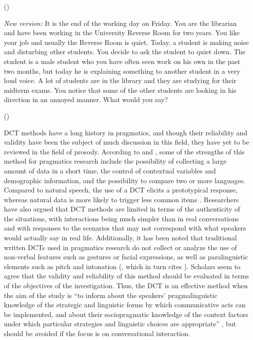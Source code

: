 \documentclass[output=paper]{LSP/langsci}
\begin{document}
(\citealt{Billmyer2000})

\textit{New version:} It is the end of the working day on Friday. You are the librarian and have been working in the University Reverse Room for two years. You like your job and usually the Reverse Room is quiet. Today, a student is making noise and disturbing other students. You decide to ask the student to quiet down. The student is a male student who you have often seen work on his own in the past two months, but today he is explaining something to another student in a very loud voice. A lot of students are in the library and they are studying for their midterm exams. You notice that some of the other students are looking in his direction in an annoyed manner. What would you say?

(\citealt{Billmyer2000})
    \z

DCT methods have a long history in pragmatics, and though their reliability and validity have been the subject of much discussion in this field, they have yet to be reviewed in the field of prosody. According to \citet{Nurani2009} and \citet{Cyluk2013}, some of the strengths of this method for pragmatics research include the possibility of collecting a large amount of data in a short time, the control of contextual variables and demographic information, and the possibility to compare two or more languages. Compared to natural speech, the use of a DCT elicits a prototypical response, whereas natural data is more likely to trigger less common items \citep{Kwon2004}. Researchers have also argued that DCT methods are limited in terms of the authenticity of the situations, with interactions being much simpler than in real conversations and with responses to the scenarios that may not correspond with what speakers would actually say in real life. Additionally, it has been noted that traditional written DCTs used in pragmatics research do not collect or analyze the use of non-verbal features such as gestures or facial expressions, as well as paralinguistic elements such as pitch and intonation (\citealt{Cyluk2013}, which in turn cites \citealt[326]{Kasper2000}). Scholars seem to agree that the validity and reliability of this method should be evaluated in terms of the objectives of the investigation. Thus, the DCT is an effective method when the aim of the study is “to inform about the speakers’ pragmalinguistic knowledge of the strategic and linguistic forms by which communicative acts can be implemented, and about their sociopragmatic knowledge of the context factors under which particular strategies and linguistic choices are appropriate” \citep[329]{Kasper2000}, but should be avoided if the focus is on conversational interaction.
\end{document}
